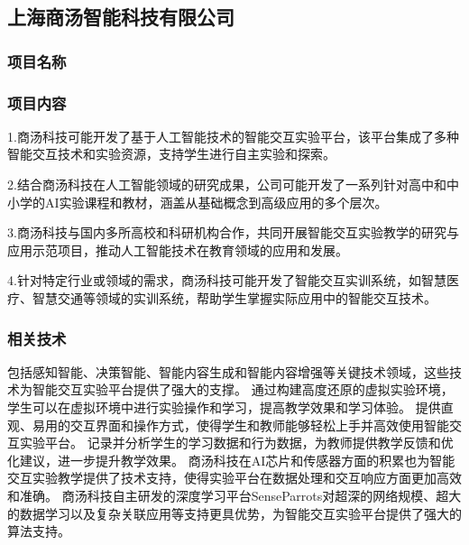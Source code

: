 \subsection{上海商汤智能科技有限公司}


\subsubsection{项目名称}


\subsubsection{项目内容}

1.商汤科技可能开发了基于人工智能技术的智能交互实验平台，该平台集成了多种智能交互技术和实验资源，支持学生进行自主实验和探索。

2.结合商汤科技在人工智能领域的研究成果，公司可能开发了一系列针对高中和中小学的AI实验课程和教材，涵盖从基础概念到高级应用的多个层次。

3.商汤科技与国内多所高校和科研机构合作，共同开展智能交互实验教学的研究与应用示范项目，推动人工智能技术在教育领域的应用和发展。

4.针对特定行业或领域的需求，商汤科技可能开发了智能交互实训系统，如智慧医疗、智慧交通等领域的实训系统，帮助学生掌握实际应用中的智能交互技术。

\subsubsection{相关技术}

包括感知智能、决策智能、智能内容生成和智能内容增强等关键技术领域，这些技术为智能交互实验平台提供了强大的支撑。
通过构建高度还原的虚拟实验环境，学生可以在虚拟环境中进行实验操作和学习，提高教学效果和学习体验。
提供直观、易用的交互界面和操作方式，使得学生和教师能够轻松上手并高效使用智能交互实验平台。
记录并分析学生的学习数据和行为数据，为教师提供教学反馈和优化建议，进一步提升教学效果。
商汤科技在AI芯片和传感器方面的积累也为智能交互实验教学提供了技术支持，使得实验平台在数据处理和交互响应方面更加高效和准确。
商汤科技自主研发的深度学习平台SenseParrots对超深的网络规模、超大的数据学习以及复杂关联应用等支持更具优势，为智能交互实验平台提供了强大的算法支持。


